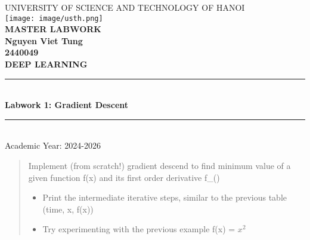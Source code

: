 \documentclass[hidelinks]{report}
\begin{document}

\begin{titlepage}

    \begin{center}
        \huge \uppercase{University of Science and Technology of Hanoi} \\ [1.5 cm]
    
        \texttt{[image: image/usth.png]} \\[1cm]

        {\huge \bfseries \uppercase{MASTER LABWORK}} \\[1cm]

        {\large \bfseries Nguyen Viet Tung} \\ [0.5cm]
        {\large \bfseries 2440049} \\ [0.7cm]
        {\huge \bfseries \uppercase{Deep Learning}} \\[1cm]
        
        \rule{\linewidth}{0.3mm} \\[0.4cm]
        { \Huge \bfseries\color{blue} Labwork 1: Gradient Descent \\[0.4cm] }
        \rule{\linewidth}{0.3mm} \\[0.7cm]
        
        \large Academic Year: 2024-2026
    \end{center}

\end{titlepage}

\newpage
{}
\tableofcontents

\newpage
\listoffigures

\thispagestyle{empty}
\newpage
{}

\begin{abstract}
    Implement (from scratch!) gradient descend to find minimum value of a given function f(x) and its first order derivative f\_()
        \begin{itemize}
            \item Print the intermediate iterative steps, similar to the previous table (time, x, f(x))
            \item Try experimenting with the previous example f(x) = $x^2$   
        \end{itemize}

\end{abstract}
\end{document}
